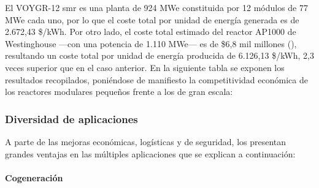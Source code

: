   El VOYGR-12 \acrshort{smr} es una planta de 924 MWe constituida por 12 módulos de 77 MWe cada uno, por lo que el coste total por unidad de energía generada es de 2.672,43 \$/kWh. Por otro lado, el coste total estimado del reactor AP1000 de Westinghouse ---con una potencia de 1.110 MWe--- es de \$6,8 mil millones (\cite{cost_ap1000}), resultando un coste total por unidad de energía producida de 6.126,13 \$/kWh, 2,3 veces superior que en el caso anterior. En la siguiente tabla se exponen los resultados recopilados, poniéndose de manifiesto la competitividad económica de los reactores modulares pequeños frente a los de gran escala:

  \begin{table}[h]
    \centering
    \caption{Comparación de costes entre una central nuclear de gran escala de generación III+ y un SMR en fase avanzada de desarrollo (\cite{cost_ap1000} y \cite{cost_evaluation_nuscale}).}
    \label{tab:comparacion_voygr_ap1000}
    \end{table}

\newpage

\subsubsection{Diversidad de aplicaciones}

A parte de las mejoras económicas, logísticas y de seguridad, los  presentan grandes ventajas en las múltiples aplicaciones que se explican a continuación:

\paragraph{Cogeneración} \label{cogeneracion}

